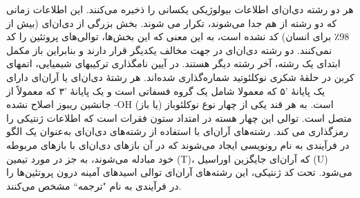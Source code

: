 \documentclass[12pt,a4paper,BCOR=.7cm,headsepline,bibliography=totoc]{report}
\begin{document}
هر دو رشته دی‌ان‌ای اطلاعات بیولوژیکی یکسانی را ذخیره می‌کنند. این اطلاعات زمانی که دو رشته از هم جدا می‌شوند، تکرار می شوند. بخش بزرگی از دی‌ان‌ای (بیش از 98٪ برای انسان) کد نشده
 است، به این معنی که این بخش‌ها، توالی‌های پروتئین را کد نمی‌کنند. دو رشته دی‌ان‌ای در جهت مخالف یکدیگر قرار دارند و بنابراین باز مکمل ابتدای یک رشته، آخر رشته دیگر هستند. در آیین نامگذاری ترکیبهای شیمیایی، اتمهای کربن در حلقهٔ شکری نوکلئوتید شماره‌گذاری شده‌اند. هر رشتهٔ دی‌ان‌ای یا آران‌ای دارای یک پایانهٔ '۵ که معمولا شامل یک گروه فسفاتی است و یک پایانهٔ '۳ که معمولاً از جانشین ریبوز اصلاح نشده -OH است. به هر قند یکی از چهار نوع نوکلئوباز (یا باز) متصل است. توالی این چهار هسته در امتداد ستون فقرات است که اطلاعات ژنتیکی را رمزگذاری می کند. رشته‌های آر‌ان‌ای با استفاده از رشته‌های دی‌ان‌ای به‌عنوان یک الگو در فرآیندی به نام رونویسی ایجاد می‌شوند که در آن بازهای دی‌ان‌ای با بازهای مربوطه خود مبادله می‌شوند، به جز در مورد تیمین (T)، که آر‌ان‌ای جایگزین اوراسیل (U) می‌شود. تحت کد ژنتیکی، این رشته‌های آر‌ان‌ای توالی اسیدهای آمینه درون پروتئین‌ها را در فرآیندی به نام "ترجمه`` مشخص می‌کنند.
\end{document}
